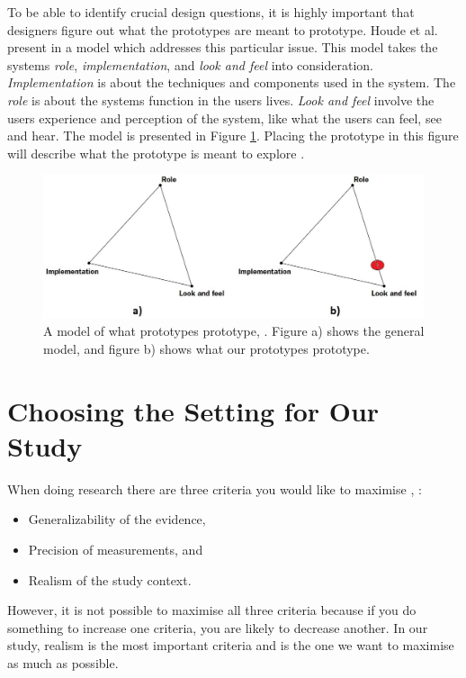 To be able to identify crucial design questions, it is highly important that designers figure out what the prototypes are meant to prototype. Houde et al. present in \cite{houde1997prototypes} a model which addresses this particular issue. This model takes the systems \emph{role}, \emph{implementation}, and \emph{look and feel} into consideration. \emph{Implementation} is about the techniques and components used in the system. The \emph{role} is about the systems function in the users lives. \emph{Look and feel} involve the users experience and perception of the system, like what the users can feel, see and hear. The model is presented in Figure \ref{fig:prototype}. Placing the prototype in this figure will describe what the prototype is meant to explore \cite{houde1997prototypes}.    


\begin{figure} [H]
\centering
\includegraphics[scale=0.4]{prototypemodelDobbel.jpg}
\caption[Prototype model]{A model of what prototypes prototype, \cite{houde1997prototypes}. Figure a) shows the general model, and figure b) shows what our prototypes prototype.}
\label{fig:prototype}
\end{figure}

\section{Choosing the Setting for Our Study}
\label{sec:experimental}
When doing research there are three criteria you would like to maximise \cite{McGrath}, \cite{alsos}: 

\begin{itemize}
\item Generalizability of the evidence,
\item Precision of measurements, and 
\item Realism of the study context.  
\end{itemize}

However, it is not possible to maximise all three criteria because if you do something to increase one criteria, you are likely to decrease another. In our study, realism is the most important criteria and is the one we want to maximise as much as possible.


